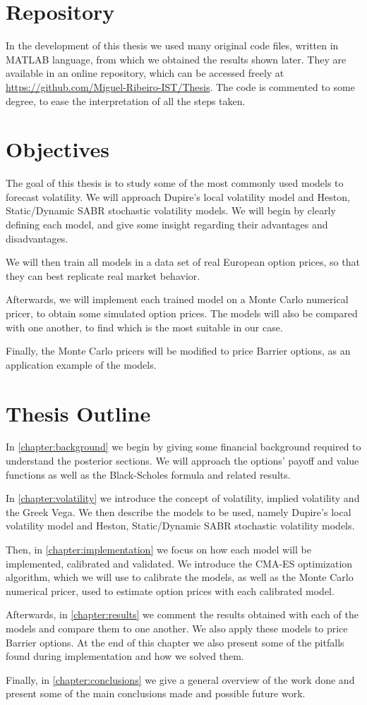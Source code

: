 \section{Repository}
In the development of this thesis we used many original code files, written in MATLAB language, from which we obtained the results shown later. They are available in an online repository, which can be accessed freely at \url{https://github.com/Miguel-Ribeiro-IST/Thesis}.
The code is commented to some degree, to ease the interpretation of all the steps taken.

\vfill
\newpage

\section{Objectives}
The goal of this thesis is to study some of the most commonly used models to forecast volatility. We will approach Dupire's local volatility model and Heston, Static/Dynamic SABR stochastic volatility models. We will begin by clearly defining each model, and give some insight regarding their advantages and disadvantages.

We will then train all models in a data set of real European option prices, so that they can best replicate real market behavior.

Afterwards, we will implement each trained model on a Monte Carlo numerical pricer, to obtain some simulated option prices. The models will also be compared with one another, to find which is the most suitable in our case.

Finally, the Monte Carlo pricers will be modified to price Barrier options, as an application example of the models.

\section{Thesis Outline}
In \autoref{chapter:background} we begin by giving some financial background required to understand the posterior sections. We will approach the options' payoff and value functions as well as the Black-Scholes formula and related results.

In \autoref{chapter:volatility} we introduce the concept of volatility, implied volatility and the Greek Vega. We then describe the models to be used, namely Dupire's local volatility model and Heston, Static/Dynamic SABR stochastic volatility models.

Then, in \autoref{chapter:implementation} we focus on how each model will be implemented, calibrated and validated. We introduce the CMA-ES optimization algorithm, which we will use to calibrate the models, as well as the Monte Carlo numerical pricer, used to estimate option prices with each calibrated model.

Afterwards, in \autoref{chapter:results} we comment the results obtained with each of the models and compare them to one another. We also apply these models to price Barrier options. At the end of this chapter we also present some of the pitfalls found during implementation and how we solved them.

Finally, in \autoref{chapter:conclusions} we give a general overview of the work done and present some of the main conclusions made and possible future work.